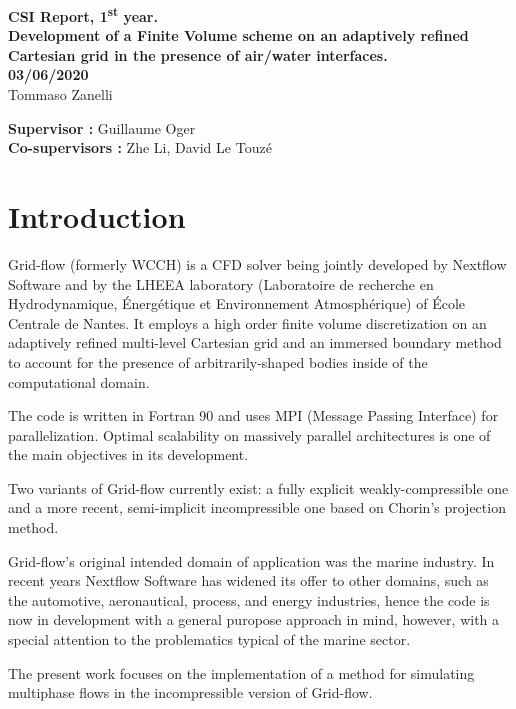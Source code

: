 \documentclass[11pt, a4paper, oneside, openany]{book}
\begin{document}
\begin{titlepage}
\begin{figure}[!ht]
\begin{subfigure}{.5\textwidth}
\end{subfigure}
 \vspace{3cm}
\end{figure}\noindent
{\LARGE \textbf{CSI Report, 1\textsuperscript{st} year.\vspace{0.2cm}\\
Development of a Finite Volume scheme on an adaptively refined Cartesian grid in the presence of air/water interfaces.}} \\
\vspace{1cm}
{\large\textbf{03/06/2020}}\\
\vspace{2em}
{\large Tommaso Zanelli} \\
\vfill
\begin{flushleft}
\textbf{Supervisor :}\: Guillaume Oger \\
\textbf{Co-supervisors :}\:  Zhe Li, David Le Touz{\'{e}}
\end{flushleft}
 \end{titlepage}

\tableofcontents
{}
\listoffigures
{}
\mainmatter
\chapter{Introduction}\label{Chapter_Introduction}
Grid-flow (formerly WCCH) is a CFD solver being jointly developed by Nextflow Software and by the LHEEA laboratory (Laboratoire de recherche en Hydrodynamique, Énergétique et Environnement Atmosphérique) of École Centrale de Nantes. It employs a high order finite volume discretization on an adaptively refined multi-level Cartesian grid and an immersed boundary method to account for the presence of arbitrarily-shaped bodies inside of the computational domain.\par
The code is written in Fortran 90 and uses MPI (Message Passing Interface) for parallelization. Optimal scalability on massively parallel architectures is one of the main objectives in its development.\par
Two variants of Grid-flow currently exist: a fully explicit weakly-compressible one and a more recent, semi-implicit incompressible one based on Chorin's projection method.\par
Grid-flow's original intended domain of application was the marine industry. In recent years Nextflow Software has widened its offer to other domains, such as the automotive, aeronautical, process, and energy industries, hence the code is now in development with a general puropose approach in mind, however, with a special attention to the problematics typical of the marine sector.\par
The present work focuses on the implementation of a method for simulating multiphase flows in the incompressible version of Grid-flow.
\end{document}
